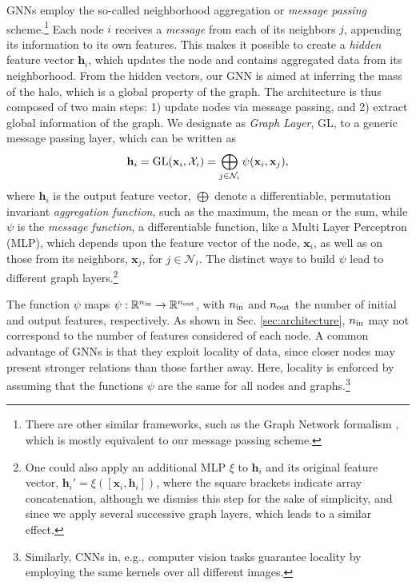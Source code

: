 \documentclass[twocolumn]{aastex631}
\begin{document}
\label{sec:messagepassing}

GNNs employ the so-called neighborhood aggregation or \textit{message passing} scheme.\footnote{There are other similar frameworks, such as the Graph Network formalism \citep{2018arXiv180601261B}, which is mostly equivalent to our message passing scheme.} Each node $i$ receives a \textit{message} from each of its neighbors $j$, appending its information to its own features. This makes it possible to create a \textit{hidden} feature vector $\textbf{h}_i$, which updates the node and contains aggregated data from its neighborhood. From the hidden vectors, our GNN is aimed at inferring the mass of the halo, which is a global property of the graph. The architecture is thus composed of two main steps: 1) update nodes via message passing, and 2) extract global information of the graph. We designate as \textit{Graph Layer}, GL, to a generic message passing layer, which can be written as 
\begin{equation}
 \textbf{h}_i = {\rm GL}(\textbf{x}_i, \mathcal{X}_i) = \bigoplus_{j \in \mathcal{N}_i} \psi(\textbf{x}_i,\textbf{x}_j),
 \label{eq:messagepassing}
\end{equation}
where $\textbf{h}_i$ is the output feature vector, $\bigoplus$ denote a differentiable, permutation invariant \textit{aggregation function}, such as the maximum, the mean or the sum, while $\psi$ is the \textit{message function}, a differentiable function, like a Multi Layer Perceptron (MLP), which depends upon the feature vector of the node, $\textbf{x}_i$, as well as on those from its neighbors, $\textbf{x}_j$, for $j \in \mathcal{N}_i$. The distinct ways to build $\psi$ lead to different graph layers.\footnote{One could also apply an additional MLP $\xi$ to $\textbf{h}_i$ and its original feature vector, $\textbf{h}_i' = \xi([\textbf{x}_i, \textbf{h}_i])$, where the square brackets indicate array concatenation, although we dismiss this step for the sake of simplicity, and since we apply several successive graph layers, which leads to a similar effect.}

The function $\psi$ maps $\psi: \mathbb{R}^{n_{\rm in}} \rightarrow \mathbb{R}^{n_{\rm out}}$, with $n_{\rm in}$ and $n_{\rm out}$ the number of initial and output features, respectively. As shown in Sec. \ref{sec:architecture}, $n_{\rm in}$ may not correspond to the number of features considered of each node. A common advantage of GNNs is that they exploit locality of data, since closer nodes may present stronger relations than those farther away. Here,  locality is enforced by assuming that the functions $\psi$ are the same for all nodes and graphs.\footnote{Similarly, CNNs in, e.g., computer vision tasks guarantee locality by employing the same kernels over all different images.} 
\end{document}
